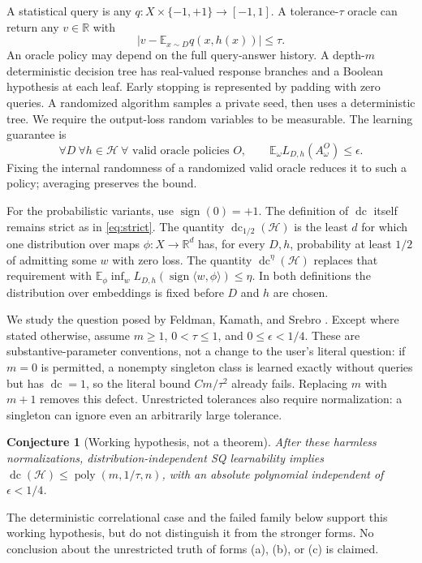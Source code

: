 \documentclass[11pt]{article}
\newtheorem*{conjecture}{Conjecture}
\DeclareMathOperator{\dc}{dc}
\DeclareMathOperator{\sign}{sign}
\newcommand{\R}{\mathbb R}
\newcommand{\E}{\mathbb E}
\newcommand{\1}{\mathbf 1}
\newcommand{\cH}{\mathcal H}
\begin{document}
A statistical query is any $q:X\times\{-1,+1\}\to[-1,1]$. A tolerance-$\tau$ oracle can return any $v\in\R$ with
\[
 |v-\E_{x\sim D}q(x,h(x))|\leq\tau.
\]
An oracle policy may depend on the full query-answer history. A depth-$m$ deterministic decision tree has real-valued response branches and a Boolean hypothesis at each leaf. Early stopping is represented by padding with zero queries. A randomized algorithm samples a private seed, then uses a deterministic tree. We require the output-loss random variables to be measurable. The learning guarantee is
\begin{equation}\label{eq:guarantee}
 \forall D\ \forall h\in\cH\ \forall\text{ valid oracle policies }O,
 \qquad \E_{\omega}L_{D,h}(A^O_\omega)\leq\epsilon.
\end{equation}
Fixing the internal randomness of a randomized valid oracle reduces it to such a policy; averaging preserves the bound.

For the probabilistic variants, use $\sign(0)=+1$. The definition of $\dc$ itself remains strict as in \eqref{eq:strict}. The quantity $\dc_{1/2}(\cH)$ is the least $d$ for which one distribution over maps $\phi:X\to\R^d$ has, for every $D,h$, probability at least $1/2$ of admitting some $w$ with zero loss. The quantity $\dc^{\eta}(\cH)$ replaces that requirement with $\E_\phi\inf_w L_{D,h}(\sign\langle w,\phi\rangle)\leq\eta$. In both definitions the distribution over embeddings is fixed before $D$ and $h$ are chosen.

We study the question posed by Feldman, Kamath, and Srebro \citep{FKS26}. Except where stated otherwise, assume $m\geq1$, $0<\tau\leq1$, and $0\leq\epsilon<1/4$. These are substantive-parameter conventions, not a change to the user's literal question: if $m=0$ is permitted, a nonempty singleton class is learned exactly without queries but has $\dc=1$, so the literal bound $Cm/\tau^2$ already fails. Replacing $m$ with $m+1$ removes this defect. Unrestricted tolerances also require normalization: a singleton can ignore even an arbitrarily large tolerance.

\begin{conjecture}[Working hypothesis, not a theorem]
After these harmless normalizations, distribution-independent SQ learnability implies $\dc(\cH)\leq\operatorname{poly}(m,1/\tau,n)$, with an absolute polynomial independent of $\epsilon<1/4$.
\end{conjecture}
The deterministic correlational case and the failed family below support this working hypothesis, but do not distinguish it from the stronger forms. No conclusion about the unrestricted truth of forms (a), (b), or (c) is claimed.
\end{document}
